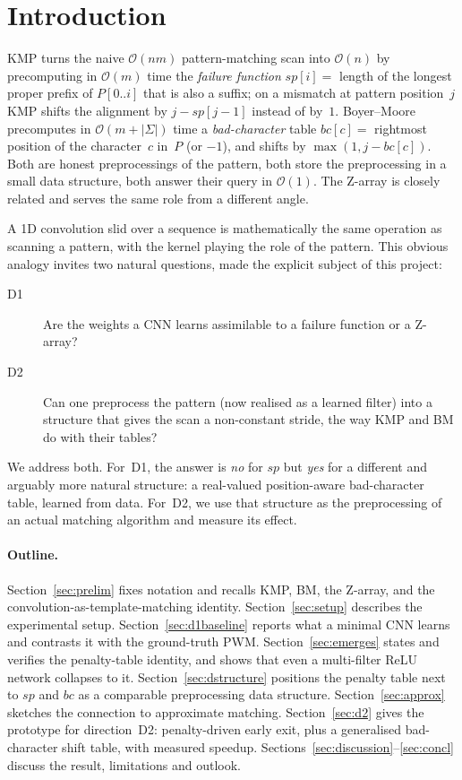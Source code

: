 \documentclass[11pt,a4paper]{article}
\newcommand{\sigmaalph}{\Sigma}
\newcommand{\bigO}[1]{\mathcal{O}(#1)}
\begin{document}
\section{Introduction}
\label{sec:intro}

KMP \cite{KMP1977} turns the naive $\bigO{nm}$ pattern-matching scan into
$\bigO{n}$ by precomputing in $\bigO{m}$ time the \emph{failure
function} $sp[i] = $ length of the longest proper prefix of $P[0..i]$
that is also a suffix; on a mismatch at pattern position~$j$ KMP shifts
the alignment by $j - sp[j-1]$ instead of by~$1$. Boyer--Moore
\cite{BoyerMoore1977} precomputes in $\bigO{m + |\sigmaalph|}$ time a
\emph{bad-character} table $bc[c] = $ rightmost position of the
character~$c$ in~$P$ (or $-1$), and shifts by $\max(1, j - bc[c])$.
Both are honest preprocessings of the pattern, both store the
preprocessing in a small data structure, both answer their query in
$\bigO{1}$. The Z-array \cite{Gusfield1997} is closely related and
serves the same role from a different angle.

A 1D convolution slid over a sequence is mathematically the same
operation as scanning a pattern, with the kernel playing the role of the
pattern. This obvious analogy invites two natural questions, made the
explicit subject of this project:
\begin{description}
\item[D1] Are the weights a CNN learns assimilable to a failure function
  or a Z-array?
\item[D2] Can one preprocess the pattern (now realised as a learned
  filter) into a structure that gives the scan a non-constant stride,
  the way KMP and BM do with their tables?
\end{description}

We address both. For~D1, the answer is \emph{no} for $sp$ but \emph{yes}
for a different and arguably more natural structure: a real-valued
position-aware bad-character table, learned from data. For~D2, we use
that structure as the preprocessing of an actual matching algorithm and
measure its effect.

\paragraph{Outline.}
Section~\ref{sec:prelim} fixes notation and recalls KMP, BM, the
Z-array, and the convolution-as-template-matching identity.
Section~\ref{sec:setup} describes the experimental setup.
Section~\ref{sec:d1baseline} reports what a minimal CNN learns and
contrasts it with the ground-truth PWM.
Section~\ref{sec:emerges} states and verifies the penalty-table
identity, and shows that even a multi-filter ReLU network collapses
to it.
Section~\ref{sec:dstructure} positions the penalty table next to $sp$
and $bc$ as a comparable preprocessing data structure.
Section~\ref{sec:approx} sketches the connection to approximate
matching.
Section~\ref{sec:d2} gives the prototype for direction~D2:
penalty-driven early exit, plus a generalised bad-character shift
table, with measured speedup.
Sections~\ref{sec:discussion}--\ref{sec:concl} discuss the result,
limitations and outlook.
\end{document}
